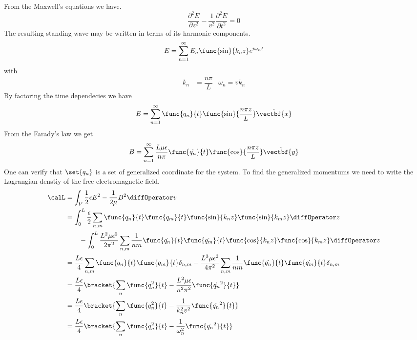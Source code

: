 From the Maxwell's equations we have.
\begin{equation*}
    \dfrac{\partial^2 E}{\partial z^2} - \dfrac{1}{v^2} \dfrac{\partial^2 E}{\partial t^2} = 0
\end{equation*}
The resulting standing wave may be written in terms of its harmonic components.
\begin{equation*}
    E = \sum_{n = 1}^{\infty} E_n \func{\sin}{k_n z} e^{i\omega_n t}
\end{equation*}
with 
\begin{align*}
    k_n &= \dfrac{n\pi}{L} & \omega_n = v k_n
\end{align*}
By factoring the time dependecies we have 
\begin{equation*}
    E = \sum_{n = 1}^{\infty} \func{q_n}{t} \func{\sin}{\dfrac{n\pi z}{L}} \hat{\vectbf{x}}
\end{equation*}
From the Farady's law we get 
\begin{equation*}
    B = \sum_{n = 1}^{\infty} \dfrac{L \mu \epsilon}{n \pi }\func{\dot{q_n}}{t} \func{\cos}{\dfrac{n\pi z}{L}} \hat{\vectbf{y}}
\end{equation*}
One can verify that \(\set{q_n}\) is a set of generalized coordinate for the system. To find the generalized momentums we need to write the Lagrangian denstiy of the free electromagnetic field.
\begin{align*}
    \calL &= \int_V \dfrac{1}{2}\epsilon E^2 - \dfrac{1}{2\mu} B^2 \diffOperator v\\
    &= \int_0^L \dfrac{\epsilon}{2} \sum_{n,m} \func{q_n}{t}\func{q_m}{t} \func{\sin}{k_n z} \func{\sin}{k_m z} \diffOperator z\\
    &\qquad - \int_0^L \dfrac{L^2 \mu \epsilon^2 }{2\pi^2} \sum_{n,m} \dfrac{1}{nm} \func{\dot{q_n}}{t}\func{\dot{q_m}}{t} \func{\cos}{k_n z} \func{\cos}{k_m z} \diffOperator z\\
    &= \dfrac{L\epsilon}{4} \sum_{n,m}  \func{q_n}{t}\func{q_m}{t} \delta_{n,m} - \dfrac{L^3 \mu \epsilon^2 }{4\pi^2} \sum_{n,m} \dfrac{1}{nm}\func{\dot{q_n}}{t}\func{\dot{q_m}}{t} \delta_{n,m}\\
    &= \dfrac{L\epsilon}{4} \bracket{\sum_n \func{q_n^2}{t} - \dfrac{L^2 \mu \epsilon }{n^2 \pi^2} \func{\dot{q_n}^2}{t}}\\
    &= \dfrac{L\epsilon}{4} \bracket{\sum_n \func{q_n^2}{t} - \dfrac{1 }{k_n^2 v^2}\func{\dot{q_n}^2}{t}}\\
    &= \dfrac{L\epsilon}{4} \bracket{\sum_n \func{q_n^2}{t} - \dfrac{1 }{\omega_n^2}\func{\dot{q_n}^2}{t}}
\end{align*}
